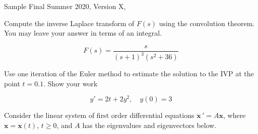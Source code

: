 \documentclass[12pt]{exam}
\newcommand{\TestName}{Sample Final Summer 2020, Version X}
\begin{document}
    


\begin{center}
{\Large \TestName, \Course }
\end{center}


\begin{questions}


    \question[5] %
    Compute the inverse Laplace transform of $F(s)$ using the convolution theorem. You may leave your answer in terms of an integral. 
    
    $$F(s) = \frac{s}{(s+1)^3(s^2+36)}$$  %
    
    
\newpage \Initials
    
    \question[2] %
    Use one iteration of the Euler method to estimate the solution to the IVP at the point $t = 0.1$. Show your work
    
    $$y' = 2t+2y^2, \quad y(0) = 3$$ %
    
    
    
\newpage \Initials

    \question[6] Consider the linear system of first order differential equations $\displaystyle \mathbf x \, ' = A \mathbf x$, where $\mathbf x = \mathbf x(t)$, $t\ge 0$, and $A$ has the eigenvalues and eigenvectors below. 



\end{questions}
\end{document}
